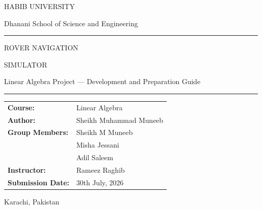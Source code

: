 \documentclass[12pt]{report}
\newcommand{\headingfont}{\sffamily}
\newcommand{\displayfont}{\sffamily}
\begin{document}
\begin{titlepage}
\centering
\vspace*{0.4cm}
{\headingfont\color{HUGrey}\large HABIB UNIVERSITY\par}
{\headingfont\color{HUGrey}\normalsize Dhanani School of Science and Engineering\par}
\vspace{0.3cm}
{\color{HUGold}\rule{0.6\linewidth}{1.2pt}\par}
\vspace{1.8cm}

{\displayfont\color{HUPurple}\fontsize{52}{52}\selectfont ROVER NAVIGATION\par}
{\displayfont\color{HUPurple}\fontsize{52}{52}\selectfont SIMULATOR\par}
\vspace{0.4cm}
{\headingfont\color{HUDark}\Large Linear Algebra Project --- Development and Preparation Guide\par}

\vspace{1.6cm}
{\color{HUGold}\rule{0.35\linewidth}{0.8pt}\par}
\vspace{1.6cm}

\begin{tabular}{ll}
\headingfont\bfseries\color{HUPurple}Course: & \color{HUDark}Linear Algebra \\[4pt]
\headingfont\bfseries\color{HUPurple}Author: & \color{HUDark}Sheikh Muhammad Muneeb \\[4pt]
\headingfont\bfseries\color{HUPurple}Group Members: & \color{HUDark}Sheikh M Muneeb \\
 & \color{HUDark}Misha Jessani \\
 & \color{HUDark}Adil Saleem \\[4pt]
\headingfont\bfseries\color{HUPurple}Instructor: & \color{HUDark}Rameez Raghib \\[4pt]
\headingfont\bfseries\color{HUPurple}Submission Date: & \color{HUDark}30th July, 2026 \\
\end{tabular}

\vfill
{\headingfont\color{HUGrey}\small Karachi, Pakistan\par}
\end{titlepage}

\tableofcontents
\clearpage
{}
\end{document}
